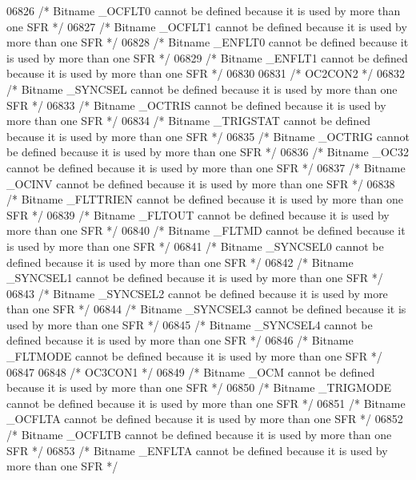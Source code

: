 \begin{DoxyCode}
06826 \textcolor{comment}{/* Bitname \_OCFLT0 cannot be defined because it is used by more than one SFR */}
06827 \textcolor{comment}{/* Bitname \_OCFLT1 cannot be defined because it is used by more than one SFR */}
06828 \textcolor{comment}{/* Bitname \_ENFLT0 cannot be defined because it is used by more than one SFR */}
06829 \textcolor{comment}{/* Bitname \_ENFLT1 cannot be defined because it is used by more than one SFR */}
06830 
06831 \textcolor{comment}{/* OC2CON2 */}
06832 \textcolor{comment}{/* Bitname \_SYNCSEL cannot be defined because it is used by more than one SFR */}
06833 \textcolor{comment}{/* Bitname \_OCTRIS cannot be defined because it is used by more than one SFR */}
06834 \textcolor{comment}{/* Bitname \_TRIGSTAT cannot be defined because it is used by more than one SFR */}
06835 \textcolor{comment}{/* Bitname \_OCTRIG cannot be defined because it is used by more than one SFR */}
06836 \textcolor{comment}{/* Bitname \_OC32 cannot be defined because it is used by more than one SFR */}
06837 \textcolor{comment}{/* Bitname \_OCINV cannot be defined because it is used by more than one SFR */}
06838 \textcolor{comment}{/* Bitname \_FLTTRIEN cannot be defined because it is used by more than one SFR */}
06839 \textcolor{comment}{/* Bitname \_FLTOUT cannot be defined because it is used by more than one SFR */}
06840 \textcolor{comment}{/* Bitname \_FLTMD cannot be defined because it is used by more than one SFR */}
06841 \textcolor{comment}{/* Bitname \_SYNCSEL0 cannot be defined because it is used by more than one SFR */}
06842 \textcolor{comment}{/* Bitname \_SYNCSEL1 cannot be defined because it is used by more than one SFR */}
06843 \textcolor{comment}{/* Bitname \_SYNCSEL2 cannot be defined because it is used by more than one SFR */}
06844 \textcolor{comment}{/* Bitname \_SYNCSEL3 cannot be defined because it is used by more than one SFR */}
06845 \textcolor{comment}{/* Bitname \_SYNCSEL4 cannot be defined because it is used by more than one SFR */}
06846 \textcolor{comment}{/* Bitname \_FLTMODE cannot be defined because it is used by more than one SFR */}
06847 
06848 \textcolor{comment}{/* OC3CON1 */}
06849 \textcolor{comment}{/* Bitname \_OCM cannot be defined because it is used by more than one SFR */}
06850 \textcolor{comment}{/* Bitname \_TRIGMODE cannot be defined because it is used by more than one SFR */}
06851 \textcolor{comment}{/* Bitname \_OCFLTA cannot be defined because it is used by more than one SFR */}
06852 \textcolor{comment}{/* Bitname \_OCFLTB cannot be defined because it is used by more than one SFR */}
06853 \textcolor{comment}{/* Bitname \_ENFLTA cannot be defined because it is used by more than one SFR */}

\end{DoxyCode}
